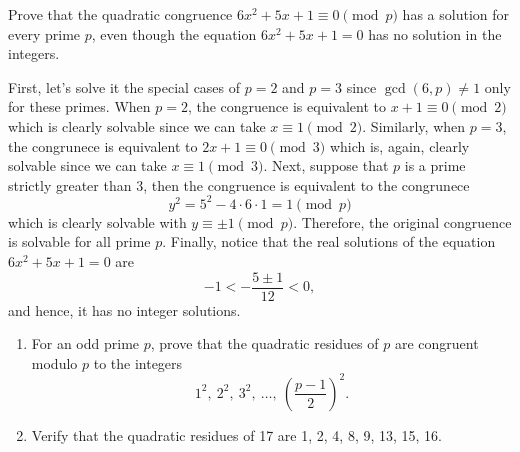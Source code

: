 \begin{exercise}
    Prove that the quadratic congruence $6x^2 + 5x + 1 \equiv 0 \pmod{p}$ has a solution for every prime $p$, even though the equation $6x^2 + 5x + 1 = 0$ has no solution in the integers. \\
\end{exercise}

\begin{solution}
    First, let's solve it the special cases of $p = 2$ and $p = 3$ since $\gcd(6,p) \neq 1$ only for these primes. When $p = 2$, the congruence is equivalent to $x + 1 \equiv 0 \pmod{2}$ which is clearly solvable since we can take $x \equiv 1 \pmod 2$. Similarly, when $p = 3$, the congrunece is equivalent to $2x + 1 \equiv 0 \pmod{3}$ which is, again, clearly solvable since we can take $x \equiv 1 \pmod{3}$. Next, suppose that $p$ is a prime strictly greater than 3, then the congruence is equivalent to the congrunece
    $$y^2 = 5^2 - 4\cdot 6 \cdot 1 = 1 \pmod{p}$$
    which is clearly solvable with $y \equiv \pm 1 \pmod p$. Therefore, the original congruence is solvable for all prime $p$. Finally, notice that the real solutions of the equation $6x^2 + 5x + 1 = 0$ are
    $$-1 < -\frac{5 \pm 1}{12} < 0,$$
    and hence, it has no integer solutions. \\
\end{solution}

\begin{exercise}
    \begin{enumerate}
        \item For an odd prime $p$, prove that the quadratic residues of $p$ are congruent modulo $p$ to the integers
        $$1^2, \ 2^2, \ 3^2, \ \dots , \ \left(\frac{p-1}{2}\right)^2.$$
        \item Verify that the quadratic residues of 17 are 1, 2, 4, 8, 9, 13, 15, 16.\\
    \end{enumerate}
\end{exercise}

